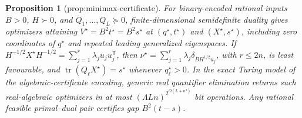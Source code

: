 \documentclass{article}
\newtheorem{proposition}{Proposition}
\begin{document}
\begin{proposition}[prop:minimax-certificate]\label{prop:minimax-certificate}
For binary-encoded rational inputs \(B>0\), \(H\succ0\), and \(Q_1,\ldots,Q_L\succeq0\), finite-dimensional semidefinite duality gives optimizers attaining \(V^{\star}=B^2t^{\star}=B^2s^{\star}\) at \((q^{\star},t^{\star})\) and \((X^{\star},s^{\star})\), including zero coordinates of \(q^{\star}\) and repeated leading generalized eigenspaces. If \(H^{-1/2}X^{\star}H^{-1/2}=\sum_{j=1}^{r}\lambda_j u_ju_j^{\mathsf T}\), then \(\nu^{\star}=\sum_{j=1}^{r}\lambda_j\delta_{BH^{1/2}u_j}\), with \(r\le2n\), is least favourable, and \(\operatorname{tr}(Q_{\ell}X^{\star})=s^{\star}\) whenever \(q_{\ell}^{\star}>0\). In the exact Turing model of the algebraic-certificate encoding, generic real quantifier elimination returns such real-algebraic optimizers in at most \((\Lambda Ln)^{2^{O(L+n^2)}}\) bit operations. Any rational feasible primal--dual pair certifies gap \(B^2(t-s)\).
\end{proposition}
\end{document}
